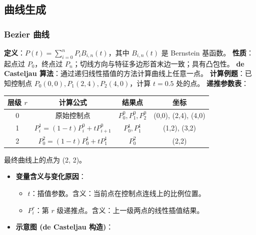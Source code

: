 \documentclass[UTF8]{ctexart}
\begin{document}
\subsection{曲线生成}

\subsubsection{Bezier 曲线}
\textbf{定义}：$P(t) = \sum_{i=0}^n P_i B_{i,n}(t)$，其中 $B_{i,n}(t)$ 是 Bernstein 基函数。
\textbf{性质}：起点过 $P_0$，终点过 $P_n$；切线方向与特征多边形首末边一致；具有凸包性。
\textbf{de Casteljau 算法}：通过递归线性插值的方法计算曲线上任意一点。
\textbf{计算例题}：已知控制点 $P_0(0,0), P_1(2,4), P_2(4,0)$，计算 $t=0.5$ 处的点。
    \textbf{递推参数表}：
    \begin{center}
    \begin{tabular}{|c|c|c|c|}
        \hline
        层级 $r$ & 计算公式 & 结果点 & 坐标 \\
        \hline
        0 & 原始控制点 & $P_0^0, P_1^0, P_2^0$ & (0,0), (2,4), (4,0) \\
        1 & $P_i^1 = (1-t)P_i^0 + tP_{i+1}^0$ & $P_0^1, P_1^1$ & (1,2), (3,2) \\
        2 & $P_0^2 = (1-t)P_0^1 + tP_1^1$ & $P_0^2$ & (2,2) \\
        \hline
    \end{tabular}
    \end{center}
    最终曲线上的点为 (2, 2)。
    \begin{itemize}
    \item \textbf{变量含义与变化原因}：
    \begin{itemize}
        \item $t$：插值参数。含义：当前点在控制点连线上的比例位置。
        \item $P_i^r$：第 $r$ 级递推点。含义：上一级两点的线性插值结果。
    \end{itemize}
    \item \textbf{示意图 (de Casteljau 构造)}：
    \begin{center}
    \end{center}
    \end{itemize}
\end{document}
